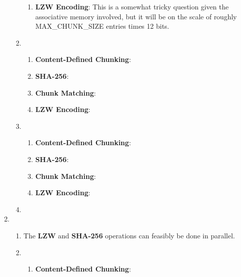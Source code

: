 \documentclass{article}
\begin{document}
\begin{enumerate}
\begin{enumerate}[label=(\alph*)]
\begin{enumerate}[label=(\roman*)]
\item%
\textbf{LZW Encoding}:\newline
This is a somewhat tricky question given the associative memory involved, but it will be on the scale of roughly MAX\_CHUNK\_SIZE entries times 12 bits.

\end{enumerate}%

\item%
\begin{enumerate}[label=(\roman*)]
\item%
\textbf{Content-Defined Chunking}:\newline

\item%
\textbf{SHA-256}:\newline

\item%
\textbf{Chunk Matching}:\newline


\item%
\textbf{LZW Encoding}:\newline


\end{enumerate}%
\item%
\begin{enumerate}[label=(\roman*)]
\item%
\textbf{Content-Defined Chunking}:\newline

\item%
\textbf{SHA-256}:\newline

\item%
\textbf{Chunk Matching}:\newline


\item%
\textbf{LZW Encoding}:\newline


\end{enumerate}%

\item%

\end{enumerate}%

\item%
\begin{enumerate}[label=(\alph*)]
\item%
The \textbf{LZW} and \textbf{SHA-256} operations can feasibly be done in parallel.
\item%
\begin{enumerate}[label=(\roman*)]
\item%
\textbf{Content-Defined Chunking}:\newline


\end{enumerate}
\end{enumerate}
\end{enumerate}
\end{document}
